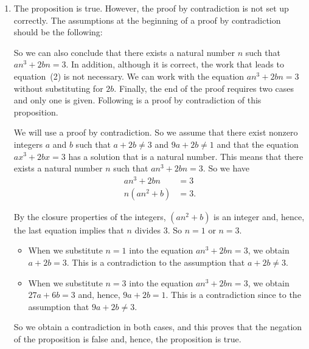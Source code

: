 \begin{enumerate}
\begin{enumerate}
\item The proposition is true.  However, the proof by contradiction is not set up correctly.  The assumptions at the beginning of a proof by contradiction should be the following:
\vskip6pt
\noindent
So we can also conclude that there exists a natural number $n$ such that $an^3 + 2bn = 3$.  In addition, although it is correct, the work that leads to equation~(2) is not necessary.  We can work with the equation $an^3 + 2bn = 3$ without substituting for $2b$.  Finally, the end of the proof requires two cases and only one is given.   Following is a proof by contradiction of this proposition.


\setcounter{equation}{0}
\begin{myproof}
We will use a proof by contradiction.  So we assume that there exist nonzero integers $a$ and $b$ such that $a + 2b \ne 3$ and $9a + 2b \ne 1$ and that the equation $ax^3 + 2bx = 3$ has a solution that is a natural number.  This means that there exists a natural number $n$ such that $an^3 + 2bn = 3$.  So we have
\begin{align*}
               an^3 + 2bn &= 3 \\
n \left( an^2 + b \right) &= 3.
\end{align*}

By the closure properties of the integers, $\left( an^2 + b \right)$ is an integer and, hence, the last equation implies that $n$ divides 3.  So $n = 1$ or $n = 3$.  

\begin{itemize}
\item When we substitute $n = 1$ into the equation $an^3 + 2bn = 3$, we obtain 
$a + 2b = 3$.  This is a contradiction to the assumption that $a + 2b \ne 3$.  

\item When we substitute $n = 3$ into the equation $an^3 + 2bn = 3$, we obtain 
$27a + 6b = 3$ and, hence, $9a + 2b = 1$.  This is a contradiction since to the assumption that $9a + 2b \ne 3$.
\end{itemize}

So we obtain a contradiction in both cases, and this proves that the negation of the proposition is false and, hence, the proposition is true.  
\end{myproof}
\end{enumerate}
\end{enumerate}



